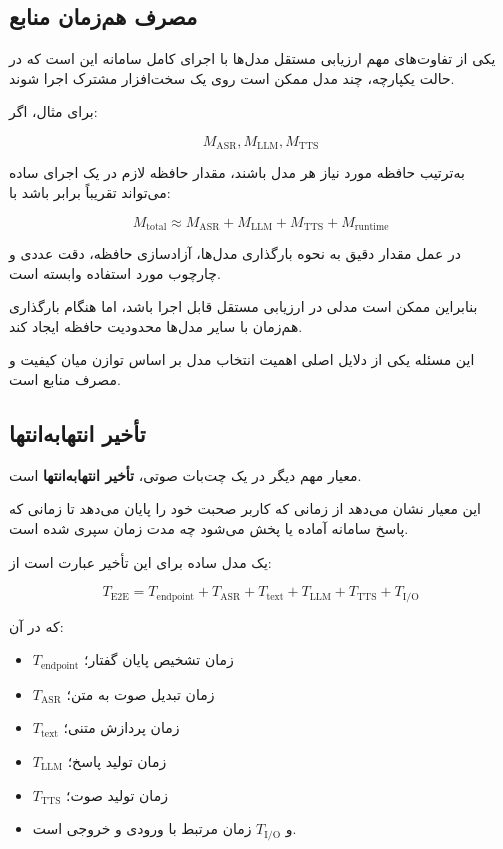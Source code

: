 \subsection{مصرف هم‌زمان منابع}

یکی از تفاوت‌های مهم ارزیابی مستقل مدل‌ها با اجرای کامل سامانه
این است که در حالت یکپارچه، چند مدل ممکن است روی یک سخت‌افزار
مشترک اجرا شوند.

برای مثال، اگر:

\[
M_{\mathrm{ASR}},
M_{\mathrm{LLM}},
M_{\mathrm{TTS}}
\]

به‌ترتیب حافظه مورد نیاز هر مدل باشند، مقدار حافظه لازم در
یک اجرای ساده می‌تواند تقریباً برابر باشد با:

\begin{equation}
M_{\mathrm{total}}
\approx
M_{\mathrm{ASR}}
+
M_{\mathrm{LLM}}
+
M_{\mathrm{TTS}}
+
M_{\mathrm{runtime}}
\end{equation}

در عمل مقدار دقیق به نحوه بارگذاری مدل‌ها، آزادسازی حافظه،
دقت عددی و چارچوب مورد استفاده وابسته است.

بنابراین ممکن است مدلی در ارزیابی مستقل قابل اجرا باشد، اما
هنگام بارگذاری هم‌زمان با سایر مدل‌ها محدودیت حافظه ایجاد کند.

این مسئله یکی از دلایل اصلی اهمیت انتخاب مدل بر اساس توازن
میان کیفیت و مصرف منابع است.


\subsection{تأخیر انتهابه‌انتها}

معیار مهم دیگر در یک چت‌بات صوتی،
\textbf{تأخیر انتهابه‌انتها}
است.

این معیار نشان می‌دهد از زمانی که کاربر صحبت خود را پایان
می‌دهد تا زمانی که پاسخ سامانه آماده یا پخش می‌شود چه مدت
زمان سپری شده است.

یک مدل ساده برای این تأخیر عبارت است از:

\begin{equation}
T_{\mathrm{E2E}}
=
T_{\mathrm{endpoint}}
+
T_{\mathrm{ASR}}
+
T_{\mathrm{text}}
+
T_{\mathrm{LLM}}
+
T_{\mathrm{TTS}}
+
T_{\mathrm{I/O}}
\end{equation}

که در آن:

\begin{itemize}

    \item $T_{\mathrm{endpoint}}$ زمان تشخیص پایان گفتار؛
    \item $T_{\mathrm{ASR}}$ زمان تبدیل صوت به متن؛
    \item $T_{\mathrm{text}}$ زمان پردازش متنی؛
    \item $T_{\mathrm{LLM}}$ زمان تولید پاسخ؛
    \item $T_{\mathrm{TTS}}$ زمان تولید صوت؛
    \item و $T_{\mathrm{I/O}}$ زمان مرتبط با ورودی و خروجی است.

\end{itemize}

